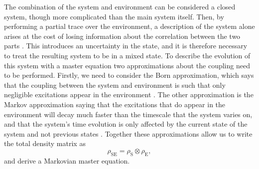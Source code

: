 The combination of the system and environment can be considered a closed system, though more complicated than the main system itself. Then, by performing a partial trace over the environment, a description of the system alone arises at the cost of losing information about the correlation between the two parts \cite{Annby-Andersson:2024}. This introduces an uncertainty in the state, and it is therefore necessary to treat the resulting system to be in a mixed state. To describe the evolution of this system with a master equation two approximations about the coupling need to be performed. Firstly, we need to consider the Born approximation, which says that the coupling between the system and environment is such that only negligible excitations appear in the environment \cite{Breuer:2007}. The other approximation is the Markov approximation saying that the excitations that do appear in the environment will decay much faster than the timescale that the system varies on, and that the system's time evolution is only affected by the current state of the system and not previous states \cite{Breuer:2007}. Together these approximations allow us to write the total density matrix as 
\begin{equation}
    \rho_\mathrm{SE} = \rho_\mathrm{S} \otimes \rho_\mathrm{E},
\end{equation}
and derive a Markovian master equation.

